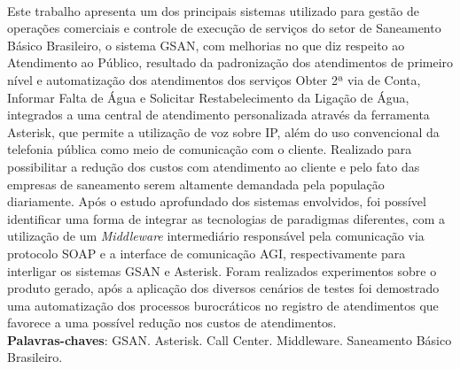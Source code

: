 \begin{description}
	\item {}\\[1.5cm]
\raggedright{Este trabalho apresenta um dos principais sistemas utilizado para gestão de operações comerciais e controle de execução de serviços do setor de Saneamento Básico Brasileiro, o sistema GSAN, com melhorias no que diz respeito ao Atendimento ao Público, resultado da padronização dos atendimentos de primeiro nível e automatização dos atendimentos dos serviços Obter 2ª via de Conta, Informar Falta de Água e Solicitar Restabelecimento da Ligação de Água, integrados a uma central de atendimento personalizada através da ferramenta Asterisk, que permite a utilização de voz sobre IP, além do uso convencional da telefonia pública como meio de comunicação com o cliente. Realizado para possibilitar a redução dos custos com atendimento ao cliente e pelo fato das empresas de saneamento serem altamente demandada pela população diariamente. Após o estudo aprofundado dos sistemas envolvidos, foi possível identificar uma forma de integrar as tecnologias de paradigmas diferentes, com a utilização de um \textit{Middleware} intermediário responsável pela comunicação via protocolo SOAP e a interface de comunicação AGI, respectivamente para interligar os sistemas GSAN e Asterisk.  Foram realizados experimentos sobre o produto gerado, após a aplicação dos diversos cenários de testes foi demostrado uma automatização dos processos burocráticos no registro de atendimentos que favorece a uma possível redução nos custos de atendimentos.
}\\
\textbf{Palavras-chaves}: GSAN. Asterisk. Call Center. Middleware. Saneamento Básico Brasileiro.
\end{description}